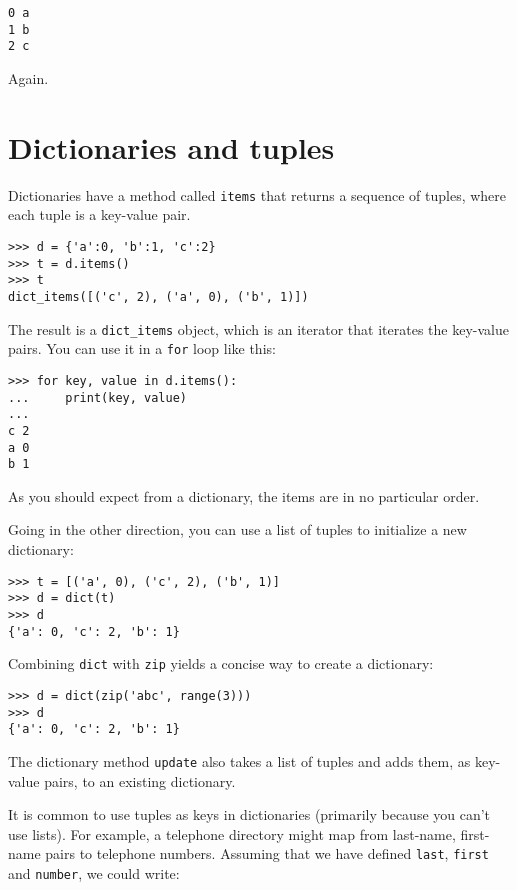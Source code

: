 \documentclass[10pt]{book}
\begin{document}
\begin{verbatim}
0 a
1 b
2 c
\end{verbatim}
%
Again.


\section{Dictionaries and tuples}
\label{dictuple}

Dictionaries have a method called {\tt items} that returns a sequence of
tuples, where each tuple is a key-value pair.

\begin{verbatim}
>>> d = {'a':0, 'b':1, 'c':2}
>>> t = d.items()
>>> t
dict_items([('c', 2), ('a', 0), ('b', 1)])
\end{verbatim}
%
The result is a \verb"dict_items" object, which is an iterator that
iterates the key-value pairs.  You can use it in a {\tt for} loop
like this:

\begin{verbatim}
>>> for key, value in d.items():
...     print(key, value)
...
c 2
a 0
b 1
\end{verbatim}
%
As you should expect from a dictionary, the items are in no
particular order.

Going in the other direction, you can use a list of tuples to
initialize a new dictionary: 

\begin{verbatim}
>>> t = [('a', 0), ('c', 2), ('b', 1)]
>>> d = dict(t)
>>> d
{'a': 0, 'c': 2, 'b': 1}
\end{verbatim}

Combining {\tt dict} with {\tt zip} yields a concise way
to create a dictionary:

\begin{verbatim}
>>> d = dict(zip('abc', range(3)))
>>> d
{'a': 0, 'c': 2, 'b': 1}
\end{verbatim}
%
The dictionary method {\tt update} also takes a list of tuples
and adds them, as key-value pairs, to an existing dictionary.

It is common to use tuples as keys in dictionaries (primarily because
you can't use lists).  For example, a telephone directory might map
from last-name, first-name pairs to telephone numbers.  Assuming
that we have defined {\tt last}, {\tt first} and {\tt number}, we
could write:
\end{document}
